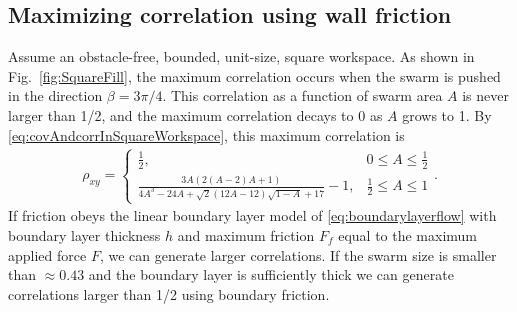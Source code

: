 \subsection{Maximizing correlation using wall friction}\label{subsec:ClosedLoopCovarianceControl}

Assume an obstacle-free, bounded, unit-size, square workspace. 
 As shown in Fig.~\ref{fig:SquareFill}, the maximum correlation occurs when the swarm is pushed in the direction $\beta = 3\pi/4$. 
 This correlation as a function of swarm area $A$ is never larger than 1/2, and the maximum correlation decays to 0 as $A$ grows to 1. By  \eqref{eq:covAndcorrInSquareWorkspace}, this maximum correlation is
\begin{align} \label{eq:GravityCorrelation}
\rho_{xy} =  \begin{cases}  \frac{1}{2}  , &  0\le A\le \frac{1}{2}  \\
 \frac{3 A (2 (A-2) A+1)}{4 A^3-24 A+\sqrt{2} (12 A-12) \sqrt{1-A}+17}-1
 , & \frac{1}{2} \le A\le 1
\end{cases}.
\end{align}
 If friction obeys the linear boundary layer model of \eqref{eq:boundarylayerflow} with boundary layer thickness $h$ and maximum friction $F_f$ equal to the maximum applied force $F$, we can generate  larger correlations.
 If the swarm size is smaller than $\approx 0.43$ and the boundary layer is sufficiently thick we can generate correlations larger than 1/2  using boundary friction.


